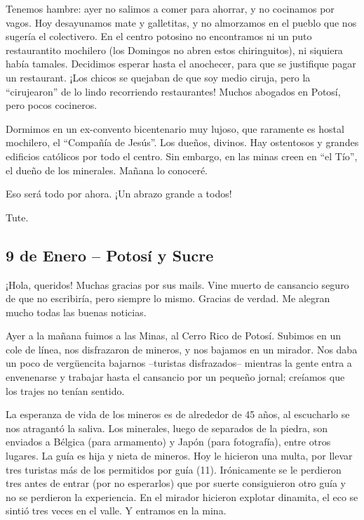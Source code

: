 Tenemos hambre: ayer no salimos a comer para ahorrar, y no cocinamos por vagos.
Hoy desayunamos mate y galletitas, y no almorzamos en el pueblo que nos sugería
el colectivero. En el centro potosino no encontramos ni un puto restaurantito
mochilero (los Domingos no abren estos chiringuitos), ni siquiera había
tamales. Decidimos esperar hasta el anochecer, para que se justifique pagar un
restaurant. ¡Los chicos se quejaban de que soy medio ciruja, pero
la ``cirujearon'' de lo lindo recorriendo restaurantes! Muchos abogados en
Potosí, pero pocos cocineros.

Dormimos en un ex-convento bicentenario muy lujoso, que raramente es hostal
mochilero, el ``Compañía de Jesús''. Los dueños, divinos. Hay ostentosos y
grandes edificios católicos por todo el centro. Sin embargo, en las minas creen
en ``el Tío'', el dueño de los minerales. Mañana lo conoceré.

Eso será todo por ahora. ¡Un abrazo grande a todos!

Tute.

\subsection*{9 de Enero -- Potosí y Sucre}

¡Hola, queridos! Muchas gracias por sus mails. Vine muerto de
cansancio seguro de que no escribiría, pero siempre lo mismo. Gracias de
verdad. Me alegran mucho todas las buenas noticias.

Ayer a la mañana fuimos a las Minas, al Cerro Rico de Potosí. Subimos en un
cole de línea, nos disfrazaron de mineros, y nos bajamos en un mirador. Nos
daba un poco de verg\"uencita bajarnos --turistas disfrazados-- mientras la
gente entra a envenenarse y trabajar hasta el cansancio por un pequeño jornal;
creíamos que los trajes no tenían sentido.

La esperanza de vida de los mineros es de alrededor de 45 años, al escucharlo
se nos atragantó la saliva. Los minerales, luego de separados de la piedra, son
enviados a Bélgica (para armamento) y Japón (para fotografía), entre otros
lugares. La guía es hija y nieta de mineros. Hoy le hicieron una multa, por
llevar tres turistas más de los permitidos por guía (11). Irónicamente se le
perdieron tres antes de entrar (por no esperarlos) que por suerte consiguieron
otro guía y no se perdieron la experiencia. En el mirador hicieron explotar
dinamita, el eco se sintió tres veces en el valle. Y entramos en la mina.

